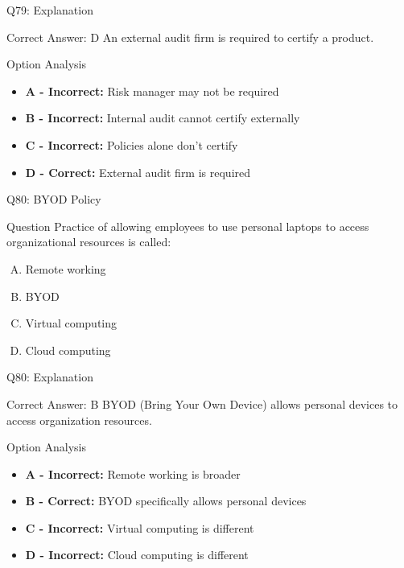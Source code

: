 \documentclass{beamer}
\begin{document}
	\begin{frame}{Q79: Explanation}
		\begin{block}{Correct Answer: D}
			An external audit firm is required to certify a product.
		\end{block}
		\begin{block}{Option Analysis}
			\begin{itemize}
				\item \textbf{A - Incorrect:} Risk manager may not be required
				\item \textbf{B - Incorrect:} Internal audit cannot certify externally
				\item \textbf{C - Incorrect:} Policies alone don't certify
				\item \textbf{D - Correct:} External audit firm is required
			\end{itemize}
		\end{block}
	\end{frame}
	
	\begin{frame}{Q80: BYOD Policy}
		\begin{block}{Question}
			Practice of allowing employees to use personal laptops to access organizational resources is called:
		\end{block}
		\begin{enumerate}[(A)]
			\item Remote working
			\item BYOD
			\item Virtual computing
			\item Cloud computing
		\end{enumerate}
	\end{frame}
	
	\begin{frame}{Q80: Explanation}
		\begin{block}{Correct Answer: B}
			BYOD (Bring Your Own Device) allows personal devices to access organization resources.
		\end{block}
		\begin{block}{Option Analysis}
			\begin{itemize}
				\item \textbf{A - Incorrect:} Remote working is broader
				\item \textbf{B - Correct:} BYOD specifically allows personal devices
				\item \textbf{C - Incorrect:} Virtual computing is different
				\item \textbf{D - Incorrect:} Cloud computing is different
			\end{itemize}
		\end{block}
	\end{frame}
	
\end{document}
